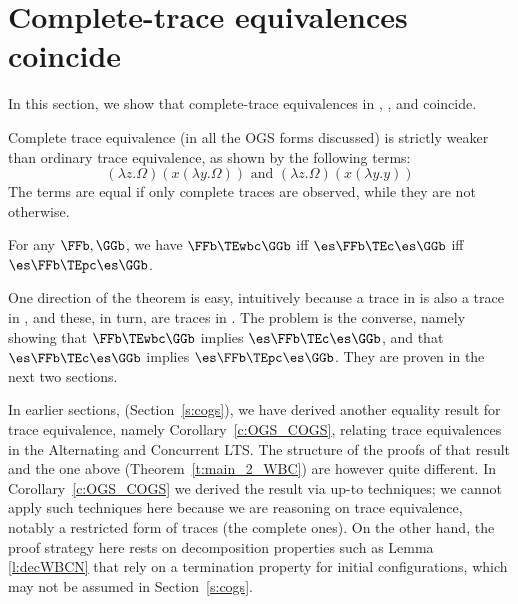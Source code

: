 \section{Complete-trace equivalences coincide }
\label{s:wbc_vs_c}

In this section, we show that complete-trace equivalences 
in \COGS, \AOGS, and \WBOGS  coincide.

\begin{remark}
Complete trace equivalence (in all the OGS forms discussed)  is strictly weaker than
ordinary trace equivalence, as shown by the following terms:
\[
 (\lambda z.\Omega)(x (\lambda y.\Omega)) \text{ and }
 (\lambda z.\Omega)(x (\lambda y.y))
\]
The terms  are equal  if only complete traces are observed, while  they are
not otherwise.
\end{remark}


\begin{theorem}
\label{t:main_2_WBC}
For any $\FFb,\GGb$, 
we have 
$\FFb  \TEwbc \GGb$
iff
$\es\FFb  \TEc \es\GGb$ iff
$\es\FFb  \TEpc \es\GGb$.
\end{theorem} 
\noindent
One direction of the theorem is easy, intuitively because a trace in 
 \WBOGS is 
also a trace in \AOGS, and these, in turn,  are traces in 
 \COGS.
The problem is the converse, namely showing 
that  
$\FFb  \TEwbc \GGb$
implies
$\es\FFb  \TEc \es\GGb$, and 
that 
$\es\FFb  \TEc \es\GGb$ 
implies $\es\FFb  \TEpc \es\GGb$.
They are proven in the next two sections.

\begin{remark}
\label{r:CT_COGS}
In earlier sections, (Section~\ref{s:cogs}),
we have  derived another equality result for
trace equivalence, namely Corollary~\ref{c:OGS_COGS}, 
relating  trace equivalences in the Alternating 
and Concurrent LTS. 
The structure of the proofs of that result and the one above 
(Theorem~\ref{t:main_2_WBC})
 are however quite different. 
In  Corollary~\ref{c:OGS_COGS} we derived the result via up-to techniques; 
we cannot apply such techniques here because we are reasoning on trace equivalence,
notably a restricted form of traces (the complete ones). 
On the other hand,  the proof strategy here 
rests on decomposition properties 
such as  Lemma \ref{l:decWBCN} that rely on a termination property for initial
configurations, which may not be assumed in 
Section~\ref{s:cogs}.
\end{remark} 

